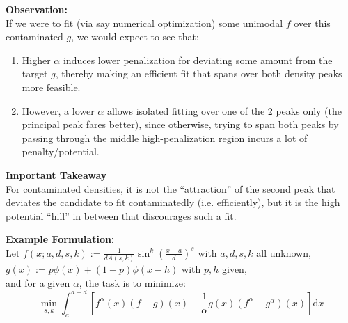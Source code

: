\documentclass[a4paper]{article}
\renewcommand{\d}{\mathrm{d}}
\newcommand{\pfrac}[2]{\left(\frac{#1}{#2}\right)}
\begin{document}
\textbf{Observation:}\\
If we were to fit (via say numerical optimization) some unimodal $f$ over this contaminated $g$, we would expect to see that:

\begin{enumerate}
	\item Higher $\alpha$ induces lower penalization for deviating some amount from the target $g$, thereby making an efficient fit that spans over both density peaks more feasible.
	
	\item However, a lower $\alpha$ allows isolated fitting over one of the 2 peaks only (the principal peak fares better), since otherwise, trying to span both peaks by passing through the middle high-penalization region incurs a lot of penalty/potential.
\end{enumerate}

\textbf{Important Takeaway}\\
For contaminated densities, it is not the ``attraction'' of the second peak that deviates the candidate to fit contaminatedly (i.e. efficiently), but it is the high potential ``hill'' in between that discourages such a fit.

\textbf{Example Formulation:}\\
Let $f(x; a,d,s,k) := \frac{1}{dA(s,k)} \sin^k \pfrac{x-a}{d}^s$ with $a,d,s,k$ all unknown,\\
$g(x) := p \phi(x) + (1-p) \phi(x-h)$ with $p, h$ given,\\
and for a given $\alpha$, the task is to minimize:
\[\min_{s,k} \int_a^{a+d} \left[f^\alpha(x) (f-g)(x) - \frac{1}{\alpha} g(x) (f^\alpha - g^\alpha)(x) \right] \d x \]
\end{document}
